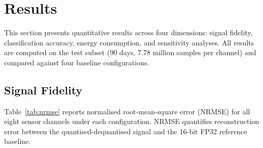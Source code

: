 \section{Results}
\label{sec:results}

This section presents quantitative results across four dimensions: signal fidelity, classification accuracy, energy consumption, and sensitivity analyses. All results are computed on the test subset (90 days, 7.78 million samples per channel) and compared against four baseline configurations.

\subsection{Signal Fidelity}
\label{sec:res_fidelity}

Table~\ref{tab:nrmse} reports normalised root-mean-square error (NRMSE) for all eight sensor channels under each configuration. NRMSE quantifies reconstruction error between the quantised-dequantised signal and the 16-bit FP32 reference baseline.

\begin{table}[H]
\centering
\caption{Normalised root-mean-square error (\%) by sensor channel and configuration on the DALTON test set (90 days).}
\label{tab:nrmse}
\end{table}

